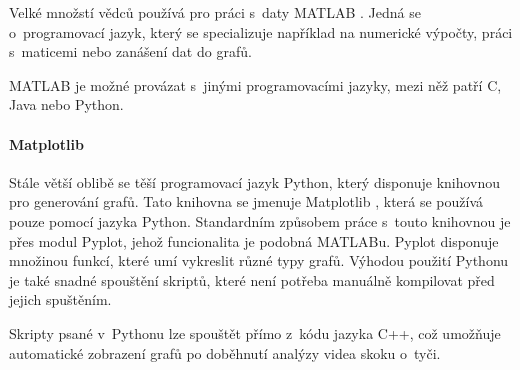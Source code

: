 Velké množstí vědců používá pro práci s~daty MATLAB \citep{MATLAB}. Jedná se o~programovací jazyk, který se specializuje například na numerické výpočty, práci s~maticemi nebo zanášení dat do grafů.

MATLAB je možné provázat s~jinými programovacími jazyky, mezi něž patří C, Java nebo Python.

\paragraph{Matplotlib}

Stále větší oblibě se těší programovací jazyk Python, který disponuje knihovnou pro generování grafů. Tato knihovna se jmenuje Matplotlib \citep{Matplotlib}, která se používá pouze pomocí jazyka Python. Standardním způsobem práce s~touto knihovnou je přes modul Pyplot, jehož funcionalita je podobná MATLABu. Pyplot disponuje množinou funkcí, které umí vykreslit různé typy grafů. Výhodou použití Pythonu je také snadné spouštění skriptů, které není potřeba manuálně kompilovat před jejich spuštěním.

Skripty psané v~Pythonu lze spouštět přímo z~kódu jazyka C++, což umožňuje automatické zobrazení grafů po doběhnutí analýzy videa skoku o~tyči.

































